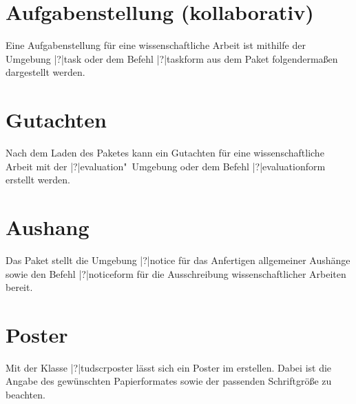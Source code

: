 \begin{Entity}{}
\section{%
  Aufgabenstellung (kollaborativ)%
  \label{sec:exmpl:task}%
}

Eine Aufgabenstellung für eine wissenschaftliche Arbeit ist mithilfe der 
Umgebung \Environment|?|{task} oder dem Befehl \Macro|?|{taskform} aus dem 
Paket  folgendermaßen dargestellt werden.



\section{%
  Gutachten%
  \label{sec:exmpl:evaluation}%
}

Nach dem Laden des Paketes  kann ein Gutachten für 
eine wissenschaftliche Arbeit mit der \Environment|?|{evaluation}"~Umgebung 
oder dem Befehl \Macro|?|{evaluationform} erstellt werden.



\section{%
  Aushang%
  \label{sec:exmpl:notice}%
}

Das Paket  stellt die Umgebung \Environment|?|{notice}
für das Anfertigen allgemeiner Aushänge sowie den Befehl \Macro|?|{noticeform}
für die Ausschreibung wissenschaftlicher Arbeiten bereit.
\end{Entity}



\section{%
  Poster%
  \label{sec:exmpl:poster}%
}

Mit der Klasse \Class|?|{tudscrposter} lässt sich ein Poster im \TUDCD 
erstellen. Dabei ist die Angabe des gewünschten Papierformates sowie der 
passenden Schriftgröße zu beachten.
%




